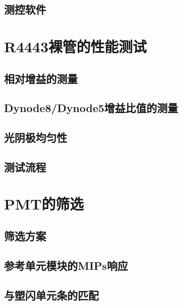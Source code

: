 \subsection{测控软件}


\section{R4443裸管的性能测试}

\subsection{相对增益的测量}
\subsection{Dynode8/Dynode5增益比值的测量}
\subsection{光阴极均匀性}
\subsection{测试流程}

\section{PMT的筛选}
\subsection{筛选方案}
\subsection{参考单元模块的MIPs响应}
\subsection{与塑闪单元条的匹配}